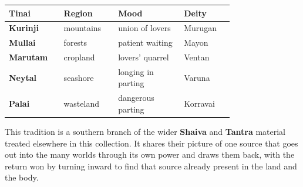\begin{longtable}{L{0.16\linewidth}
L{0.18\linewidth} L{0.24\linewidth} L{0.18\linewidth}}
\toprule
\textbf{Tinai} & \textbf{Region} & \textbf{Mood} & \textbf{Deity} \\
\midrule
\textbf{Kurinji} & mountains & union of lovers & Murugan \\
\textbf{Mullai} & forests & patient waiting & Mayon \\
\textbf{Marutam} & cropland & lovers' quarrel & Ventan \\
\textbf{Neytal} & seashore & longing in parting & Varuna \\
\textbf{Palai} & wasteland & dangerous parting & Korravai \\
\bottomrule
\end{longtable}

This tradition is a southern branch of the wider \textbf{Shaiva} and \textbf{Tantra} material treated elsewhere in this collection. It shares their picture of one source that goes out into the many worlds through its own power and draws them back, with the return won by turning inward to find that source already present in the land and the body.
